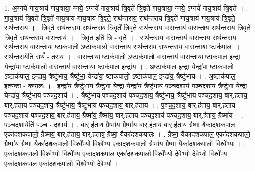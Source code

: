 \documentclass[17pt]{extarticle}
\begin{document}
1. अ॒ग्नये॑ गाय॒त्राय॑ गाय॒त्राया॒ ग्नये॒ ऽग्नये॑ गाय॒त्राय॑ त्रि॒वृते᳚ त्रि॒वृते॑ गाय॒त्राया॒ ग्नये॒ ऽग्नये॑ गाय॒त्राय॑ त्रि॒वृते᳚ । . गा॒य॒त्राय॑ त्रि॒वृते᳚ त्रि॒वृते॑ गाय॒त्राय॑ गाय॒त्राय॑ त्रि॒वृते॒ राथ॑न्तराय॒ राथ॑न्तराय त्रि॒वृते॑ गाय॒त्राय॑ गाय॒त्राय॑ त्रि॒वृते॒ राथ॑न्तराय । . त्रि॒वृते॒ राथ॑न्तराय॒ राथ॑न्तराय त्रि॒वृते᳚ त्रि॒वृते॒ राथ॑न्तराय वास॒न्ताय॑ वास॒न्ताय॒ राथ॑न्तराय त्रि॒वृते᳚ त्रि॒वृते॒ राथ॑न्तराय वास॒न्ताय॑ । . त्रि॒वृत॒ इति॑ त्रि - वृते᳚ । . राथ॑न्तराय वास॒न्ताय॑ वास॒न्ताय॒ राथ॑न्तराय॒ राथ॑न्तराय वास॒न्ताया॒ ष्टाक॑पालो॒ ऽष्टाक॑पालो वास॒न्ताय॒ राथ॑न्तराय॒ राथ॑न्तराय वास॒न्ताया॒ ष्टाक॑पालः । . राथ॑न्तरा॒येति॒ राथं᳚ - त॒रा॒य॒ । . वा॒स॒न्ताया॒ ष्टाक॑पालो॒ ऽष्टाक॑पालो वास॒न्ताय॑ वास॒न्ताया॒ ष्टाक॑पाल॒ इन्द्रा॒ येन्द्रा॑या॒ ष्टाक॑पालो वास॒न्ताय॑ वास॒न्ताया॒ ष्टाक॑पाल॒ इन्द्रा॑य । . अ॒ष्टाक॑पाल॒ इन्द्रा॒ येन्द्रा॑या॒ ष्टाक॑पालो॒ ऽष्टाक॑पाल॒ इन्द्रा॑य॒ त्रैष्टु॑भाय॒ त्रैष्टु॑भा॒ येन्द्रा॑या॒ ष्टाक॑पालो॒ ऽष्टाक॑पाल॒ इन्द्रा॑य॒ त्रैष्टु॑भाय । . अ॒ष्टाक॑पाल॒ इत्य॒ष्टा - क॒पा॒लः॒ । . इन्द्रा॑य॒ त्रैष्टु॑भाय॒ त्रैष्टु॑भा॒ येन्द्रा॒ येन्द्रा॑य॒ त्रैष्टु॑भाय पञ्चद॒शाय॑ पञ्चद॒शाय॒ त्रैष्टु॑भा॒ येन्द्रा॒ येन्द्रा॑य॒ त्रैष्टु॑भाय पञ्चद॒शाय॑ । . त्रैष्टु॑भाय पञ्चद॒शाय॑ पञ्चद॒शाय॒ त्रैष्टु॑भाय॒ त्रैष्टु॑भाय पञ्चद॒शाय॒ बार्.ह॑ताय॒ बार्.ह॑ताय पञ्चद॒शाय॒ त्रैष्टु॑भाय॒ त्रैष्टु॑भाय पञ्चद॒शाय॒ बार्.ह॑ताय । . प॒ञ्च॒द॒शाय॒ बार्.ह॑ताय॒ बार्.ह॑ताय पञ्चद॒शाय॑ पञ्चद॒शाय॒ बार्.ह॑ताय॒ ग्रैष्मा॑य॒ ग्रैष्मा॑य॒ बार्.ह॑ताय पञ्चद॒शाय॑ पञ्चद॒शाय॒ बार्.ह॑ताय॒ ग्रैष्मा॑य । . प॒ञ्च॒द॒शायेति॑ पञ्च - द॒शाय॑ । . बार्.ह॑ताय॒ ग्रैष्मा॑य॒ ग्रैष्मा॑य॒ बार्.ह॑ताय॒ बार्.ह॑ताय॒ ग्रैष्मा॒ यैका॑दशकपाल॒ एका॑दशकपालो॒ ग्रैष्मा॑य॒ बार्.ह॑ताय॒ बार्.ह॑ताय॒ ग्रैष्मा॒ यैका॑दशकपालः । . ग्रैष्मा॒ यैका॑दशकपाल॒ एका॑दशकपालो॒ ग्रैष्मा॑य॒ ग्रैष्मा॒ यैका॑दशकपालो॒ विश्वे᳚भ्यो॒ विश्वे᳚भ्य॒ एका॑दशकपालो॒ ग्रैष्मा॑य॒ ग्रैष्मा॒ यैका॑दशकपालो॒ विश्वे᳚भ्यः । . एका॑दशकपालो॒ विश्वे᳚भ्यो॒ विश्वे᳚भ्य॒ एका॑दशकपाल॒ एका॑दशकपालो॒ विश्वे᳚भ्यो दे॒वेभ्यो॑ दे॒वेभ्यो॒ विश्वे᳚भ्य॒ एका॑दशकपाल॒ एका॑दशकपालो॒ विश्वे᳚भ्यो दे॒वेभ्यः॑ । \newline
\end{document}
